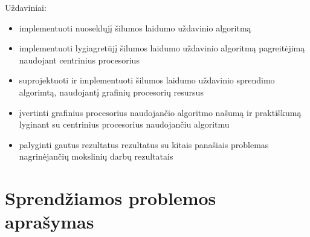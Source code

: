 \documentclass{VUMIFPSbakalaurinis}
\begin{document}



Uždaviniai:
\begin{itemize}
    \item implementuoti nuoseklųjį šilumos laidumo uždavinio algoritmą
    \item implementuoti lygiagretūjį šilumos laidumo uždavinio algoritmą pagreitėjimą naudojant centrinius procesorius
    \item suprojektuoti ir implementuoti šilumos laidumo uždavinio sprendimo algorimtą, naudojantį grafinių procesorių resursus
    \item įvertinti grafinius procesorius naudojančio algoritmo našumą ir praktiškumą lyginant su centrinius procesorius naudojančiu algoritmu
    \item palyginti gautus rezultatus rezultatus su kitais panašiais problemas nagrinėjančių mokslinių darbų rezultatais
\end{itemize}



\section{Sprendžiamos problemos aprašymas}
\end{document}
